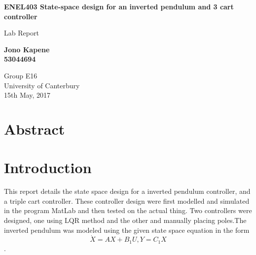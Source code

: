 \documentclass[a4paper,12pt]{article}
\begin{document}
	\begin{titlepage}
    		\begin{center}
        		\vspace*{1cm}
        
        		\textbf{ENEL403  State-space design for an inverted pendulum and 3 cart controller}
        
        		\vspace{0.5cm}
        		Lab Report
        
        		\vspace{1.5cm}
        
        		\textbf{Jono Kapene \\ 53044694}
        
        		\vfill
        		
        		\vspace{0.8cm}
        
        		Group E16\\
        		University of Canterbury\\
        		15th May, 2017
        
    \end{center}
\end{titlepage}
	\clearpage
	
\section{Abstract}
\clearpage
\section{Introduction}

This report details the state space design for a inverted pendulum controller, and a triple cart controller. These controller design were first modelled and simulated in the program MatLab and then tested on the actual thing. Two controllers were designed, one using LQR method and the other and manually placing poles.The inverted pendulum was modeled using the given state space equation in the form $$\dot{X}=AX+B_1U,Y=C_1X$$.
\end{document}
